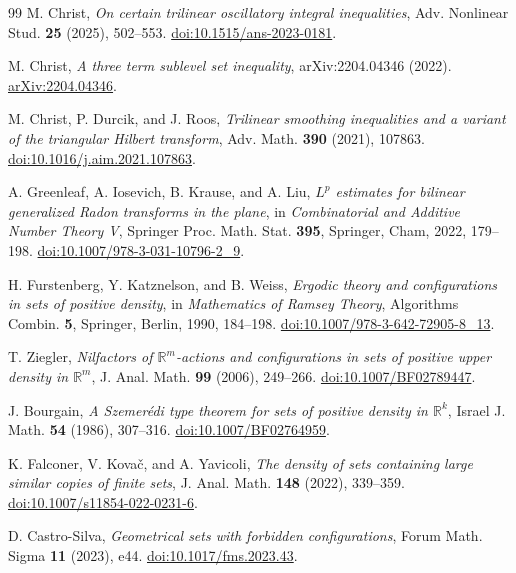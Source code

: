 \documentclass[11pt]{amsart}
\newcommand{\R}{\mathbb R}
\theoremstyle{definition}
\theoremstyle{remark}
\numberwithin{equation}{section}
\begin{document}
\begin{thebibliography}{99}
M. Christ,
\emph{On certain trilinear oscillatory integral inequalities},
Adv. Nonlinear Stud. \textbf{25} (2025), 502--553.
\href{https://doi.org/10.1515/ans-2023-0181}{doi:10.1515/ans-2023-0181}.

M. Christ,
\emph{A three term sublevel set inequality},
arXiv:2204.04346 (2022).
\href{https://arxiv.org/abs/2204.04346}{arXiv:2204.04346}.

M. Christ, P. Durcik, and J. Roos,
\emph{Trilinear smoothing inequalities and a variant of the triangular Hilbert transform},
Adv. Math. \textbf{390} (2021), 107863.
\href{https://doi.org/10.1016/j.aim.2021.107863}{doi:10.1016/j.aim.2021.107863}.

A. Greenleaf, A. Iosevich, B. Krause, and A. Liu,
\emph{$L^p$ estimates for bilinear generalized Radon transforms in the plane},
in \emph{Combinatorial and Additive Number Theory V}, Springer Proc. Math. Stat. \textbf{395},
Springer, Cham, 2022, 179--198.
\href{https://doi.org/10.1007/978-3-031-10796-2_9}{doi:10.1007/978-3-031-10796-2\_9}.

H. Furstenberg, Y. Katznelson, and B. Weiss,
\emph{Ergodic theory and configurations in sets of positive density},
in \emph{Mathematics of Ramsey Theory}, Algorithms Combin. \textbf{5},
Springer, Berlin, 1990, 184--198.
\href{https://doi.org/10.1007/978-3-642-72905-8_13}{doi:10.1007/978-3-642-72905-8\_13}.

T. Ziegler,
\emph{Nilfactors of $\R^m$-actions and configurations in sets of positive upper density in $\R^m$},
J. Anal. Math. \textbf{99} (2006), 249--266.
\href{https://doi.org/10.1007/BF02789447}{doi:10.1007/BF02789447}.

J. Bourgain,
\emph{A Szemer\'edi type theorem for sets of positive density in $\R^k$},
Israel J. Math. \textbf{54} (1986), 307--316.
\href{https://doi.org/10.1007/BF02764959}{doi:10.1007/BF02764959}.

K. Falconer, V. Kova\v{c}, and A. Yavicoli,
\emph{The density of sets containing large similar copies of finite sets},
J. Anal. Math. \textbf{148} (2022), 339--359.
\href{https://doi.org/10.1007/s11854-022-0231-6}{doi:10.1007/s11854-022-0231-6}.

D. Castro-Silva,
\emph{Geometrical sets with forbidden configurations},
Forum Math. Sigma \textbf{11} (2023), e44.
\href{https://doi.org/10.1017/fms.2023.43}{doi:10.1017/fms.2023.43}.


\end{thebibliography}
\end{document}
